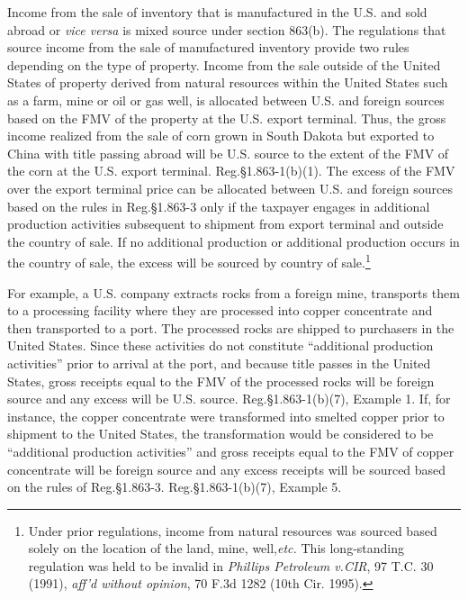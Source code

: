 Income from the sale of inventory that is manufactured in the U.S. and sold abroad or \emph{vice versa} is mixed source under section 863(b).   The regulations that source income from the sale of manufactured inventory provide two rules depending on the type of property.  Income from the sale outside of the United States of property derived from natural resources within the United States such as a farm, mine or oil or gas well, is allocated between U.S. and foreign sources based on the FMV of the property at the U.S. export terminal.  Thus, the gross income realized from the sale of corn grown in South Dakota but exported to China with title passing abroad will be U.S. source to the extent of the FMV of the corn at the U.S. export terminal.  Reg.\@ \S1.863-1(b)(1).  The excess of the FMV over the export terminal price can be allocated between U.S. and foreign sources based on the rules in Reg.\@ \S 1.863-3 only if the taxpayer engages in additional production activities subsequent to shipment from export terminal and outside the country of sale.  If no additional production or additional production occurs in the country of sale, the excess will be sourced by country of sale.\footnote{Under prior regulations, income from natural resources was sourced based solely on the location of the land, mine, well,\emph{etc.} This long-standing regulation was held to be invalid in \emph{Phillips Petroleum v.\@ CIR}, 97 T.C. 30 (1991), \emph{aff'd without opinion}, 70 F.3d 1282 (10th Cir. 1995).}

For example, a U.S. company extracts rocks from a foreign mine, transports them to a processing facility where they are processed into copper concentrate and then transported to a port.  The processed rocks are shipped to purchasers in the United States.  Since these activities do not constitute ``additional production activities'' prior to arrival at the port, and because title passes in the United States, gross receipts equal to the FMV of the processed rocks will be foreign source and any excess will be U.S. source.  Reg.\@ \S 1.863-1(b)(7), Example 1.  If, for instance, the copper concentrate were transformed into smelted copper prior to shipment to the United States, the transformation would be considered to be ``additional production activities'' and gross receipts equal to the FMV of copper concentrate will be foreign source and any excess receipts will be sourced based on the rules of Reg.\@ \S1.863-3. Reg.\@ \S 1.863-1(b)(7), Example 5.  

